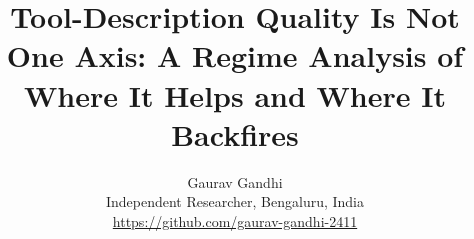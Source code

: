 \documentclass[11pt]{article}
\title{Tool-Description Quality Is Not One Axis: A Regime Analysis of Where It Helps and Where It Backfires}
\author{Gaurav Gandhi \\ Independent Researcher, Bengaluru, India \\ \url{https://github.com/gaurav-gandhi-2411}}
\date{}
\begin{document}
\maketitle

\begin{abstract}

\end{abstract}





\end{document}
